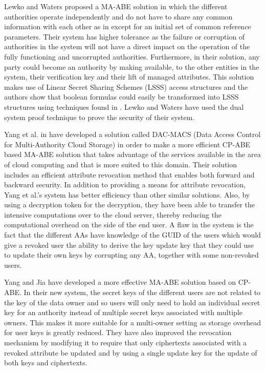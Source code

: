 Lewko and Waters proposed a MA-ABE \cite{Lewko2011a, Lewko2011b} solution in which the different authorities operate independently and do not have to share any common information with each other as in \cite{Chase2007} except for an initial set of common reference parameters. Their system has higher tolerance as the failure or corruption of authorities in the system will not have a direct impact on the operation of the fully functioning and uncorrupted authorities. Furthermore, in their solution, any party could become an authority by making available, to the other entities in the system, their verification key and their lift of managed attributes. This solution makes use of Linear Secret Sharing Schemes (LSSS) access structures and the authors show that boolean formulas could easily be transformed into LSSS structures using techniques found in \cite{Lewko2011b}. Lewko and Waters have used the dual system proof technique to prove the security of their system.

Yang et al. in \cite{Yang2013} have developed a solution called DAC-MACS (Data Access Control for Multi-Authority Cloud Storage) in order to make a more efficient CP-ABE based MA-ABE solution that takes advantage of the services available in the area of cloud computing and that is more suited to this domain. Their solution includes an efficient attribute revocation method that enables both forward and backward security. In addition to providing a means for attribute revocation, Yang et al.'s system \cite{Yang2013} has better efficiency than other similar solutions. Also, by using a decryption token for the decryption, they have been able to transfer the intensive computations over to the cloud server, thereby reducing the computational overhead on the side of the end user. A flaw in the system is the fact that the different AAs have knowledge of the GUID of the users which would give a revoked user the ability to derive the key update key that they could use to update their own keys by corrupting any AA, together with some non-revoked users.

Yang and Jia \cite{Yang2014} have developed a more effective MA-ABE solution based on CP-ABE. In their new system, the secret keys of the different users are not related to the key of the data owner and so users will only need to hold an individual secret key for an authority instead of multiple secret keys associated with multiple owners. This makes it more suitable for a multi-owner setting as storage overhead for user keys is greatly reduced. They have also improved the revocation mechanism by modifying it to require that only ciphertexts associated with a revoked attribute be updated and by using a single update key for the update of both keys and ciphertexts.

